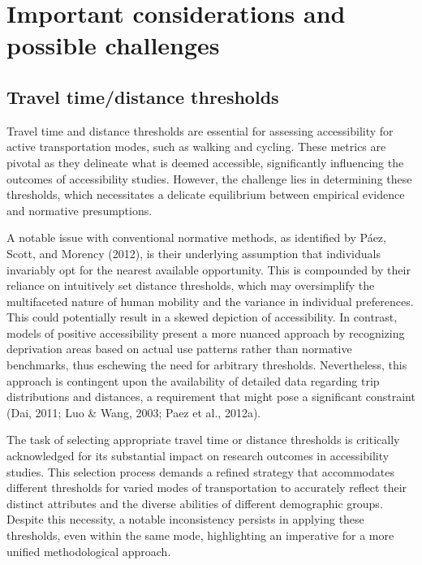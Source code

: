 \documentclass[
11pt, %
oneside, %
english, %
singlespacing, %
]{macthesis} %
\begin{document}
\hypertarget{important-considerations-and-possible-challenges}{%
\section{Important considerations and possible challenges}\label{important-considerations-and-possible-challenges}}

\hypertarget{travel-timedistance-thresholds}{%
\subsection{Travel time/distance thresholds}\label{travel-timedistance-thresholds}}

Travel time and distance thresholds are essential for assessing accessibility for active transportation modes, such as walking and cycling. These metrics are pivotal as they delineate what is deemed accessible, significantly influencing the outcomes of accessibility studies. However, the challenge lies in determining these thresholds, which necessitates a delicate equilibrium between empirical evidence and normative presumptions.

A notable issue with conventional normative methods, as identified by Páez, Scott, and Morency (2012), is their underlying assumption that individuals invariably opt for the nearest available opportunity. This is compounded by their reliance on intuitively set distance thresholds, which may oversimplify the multifaceted nature of human mobility and the variance in individual preferences. This could potentially result in a skewed depiction of accessibility. In contrast, models of positive accessibility present a more nuanced approach by recognizing deprivation areas based on actual use patterns rather than normative benchmarks, thus eschewing the need for arbitrary thresholds. Nevertheless, this approach is contingent upon the availability of detailed data regarding trip distributions and distances, a requirement that might pose a significant constraint (Dai, 2011; Luo \& Wang, 2003; Paez et al., 2012a).

The task of selecting appropriate travel time or distance thresholds is critically acknowledged for its substantial impact on research outcomes in accessibility studies. This selection process demands a refined strategy that accommodates different thresholds for varied modes of transportation to accurately reflect their distinct attributes and the diverse abilities of different demographic groups. Despite this necessity, a notable inconsistency persists in applying these thresholds, even within the same mode, highlighting an imperative for a more unified methodological approach.
\end{document}
